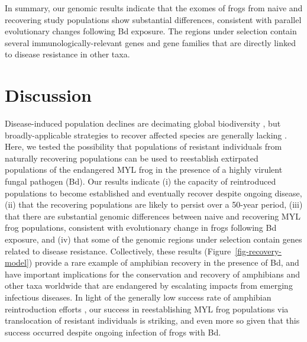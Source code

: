 \documentclass[9pt,twocolumn,twoside,lineno]{pnas-new}
\begin{document}
In summary, our genomic results indicate that the exomes of frogs from
naive and recovering study populations show substantial differences,
consistent with parallel evolutionary changes following Bd exposure. The
regions under selection contain several immunologically-relevant genes
and gene families that are directly linked to disease resistance in
other taxa.

\section*{Discussion}

Disease-induced population declines are decimating global biodiversity
\citep{daszak2000}, but broadly-applicable strategies to recover
affected species are generally lacking \citep[e.g.,][]{garner2016}.
Here, we tested the possibility that populations of resistant
individuals from naturally recovering populations can be used to
reestablish extirpated populations of the endangered MYL frog in the
presence of a highly virulent fungal pathogen (Bd). Our results indicate
(i) the capacity of reintroduced populations to become established and
eventually recover despite ongoing disease, (ii) that the recovering
populations are likely to persist over a 50-year period, (iii) that
there are substantial genomic differences between naive and recovering
MYL frog populations, consistent with evolutionary change in frogs
following Bd exposure, and (iv) that some of the genomic regions under
selection contain genes related to disease resistance. Collectively,
these results (Figure~\ref{fig-recovery-model}) provide a rare example
of amphibian recovery in the presence of Bd, and have important
implications for the conservation and recovery of amphibians and other
taxa worldwide that are endangered by escalating impacts from emerging
infectious diseases. In light of the generally low success rate of
amphibian reintroduction efforts \citep{dodd2005}, our success in
reestablishing MYL frog populations via translocation of resistant
individuals is striking, and even more so given that this success
occurred despite ongoing infection of frogs with Bd.
\end{document}
